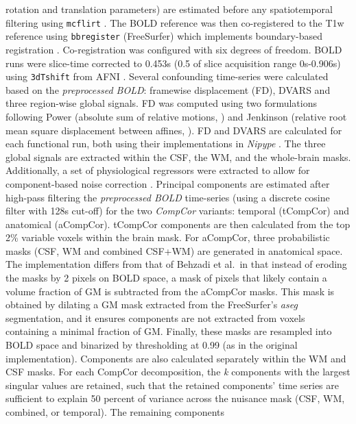 \documentclass[
]{article}
\begin{document}
\begin{description}
rotation and translation parameters) are estimated before any
spatiotemporal filtering using \texttt{mcflirt} \citep[FSL
,][]{mcflirt}. The BOLD reference was then co-registered to the T1w
reference using \texttt{bbregister} (FreeSurfer) which implements
boundary-based registration \citep{bbr}. Co-registration was configured
with six degrees of freedom. BOLD runs were slice-time corrected to
0.453s (0.5 of slice acquisition range 0s-0.906s) using
\texttt{3dTshift} from AFNI \citep[RRID:SCR\_005927]{afni}. Several
confounding time-series were calculated based on the \emph{preprocessed
BOLD}: framewise displacement (FD), DVARS and three region-wise global
signals. FD was computed using two formulations following Power
(absolute sum of relative motions, \citet{power_fd_dvars}) and Jenkinson
(relative root mean square displacement between affines,
\citet{mcflirt}). FD and DVARS are calculated for each functional run,
both using their implementations in \emph{Nipype} \citep[following the
definitions by][]{power_fd_dvars}. The three global signals are
extracted within the CSF, the WM, and the whole-brain masks.
Additionally, a set of physiological regressors were extracted to allow
for component-based noise correction \citep[\emph{CompCor},][]{compcor}.
Principal components are estimated after high-pass filtering the
\emph{preprocessed BOLD} time-series (using a discrete cosine filter
with 128s cut-off) for the two \emph{CompCor} variants: temporal
(tCompCor) and anatomical (aCompCor). tCompCor components are then
calculated from the top 2\% variable voxels within the brain mask. For
aCompCor, three probabilistic masks (CSF, WM and combined CSF+WM) are
generated in anatomical space. The implementation differs from that of
Behzadi et al.~in that instead of eroding the masks by 2 pixels on BOLD
space, a mask of pixels that likely contain a volume fraction of GM is
subtracted from the aCompCor masks. This mask is obtained by dilating a
GM mask extracted from the FreeSurfer's \emph{aseg} segmentation, and it
ensures components are not extracted from voxels containing a minimal
fraction of GM. Finally, these masks are resampled into BOLD space and
binarized by thresholding at 0.99 (as in the original implementation).
Components are also calculated separately within the WM and CSF masks.
For each CompCor decomposition, the \emph{k} components with the largest
singular values are retained, such that the retained components' time
series are sufficient to explain 50 percent of variance across the
nuisance mask (CSF, WM, combined, or temporal). The remaining components

\end{description}
\end{document}
